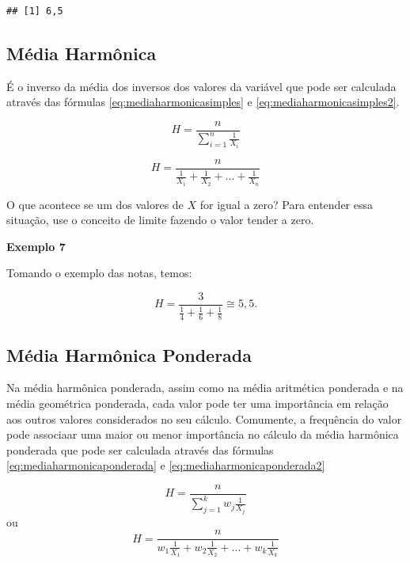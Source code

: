 \documentclass[
]{book}
\begin{document}
\begin{verbatim}
## [1] 6,5
\end{verbatim}

\hypertarget{muxe9dia-harmuxf4nica}{%
\subsection{Média Harmônica}\label{muxe9dia-harmuxf4nica}}

É o inverso da média dos inversos dos valores da variável que pode ser calculada através das fórmulas \eqref{eq:mediaharmonicasimples} e \eqref{eq:mediaharmonicasimples2}.

\begin{equation}
    H = \frac{n}{\sum_{i=1}^{n}\frac{1}{X_i}}
    \label{eq:mediaharmonicasimples}
\end{equation}

\begin{equation}
    H = \frac{n}{\frac{1}{X_1} + \frac{1}{X_2} + \ldots + \frac{1}{X_n}}
    \label{eq:mediaharmonicasimples2}
\end{equation}

O que acontece se um dos valores de \(X\) for igual a zero? Para entender essa situação, use o conceito de limite fazendo o valor tender a zero.

\textbf{Exemplo 7}

Tomando o exemplo das notas, temos:

\begin{equation*}
    H = \frac{3}{\frac{1}{4} + \frac{1}{6} + \frac{1}{8}}\cong 5,5.
\end{equation*}

\hypertarget{muxe9dia-harmuxf4nica-ponderada}{%
\subsection{Média Harmônica Ponderada}\label{muxe9dia-harmuxf4nica-ponderada}}

Na média harmônica ponderada, assim como na média aritmética ponderada e na média geométrica ponderada, cada valor pode ter uma importância em relação aos outros valores considerados no seu cálculo. Comumente, a frequência do valor pode associaar uma maior ou menor importância no cálculo da média harmônica ponderada que pode ser calculada através das fórmulas \eqref{eq:mediaharmonicaponderada} e \eqref{eq:mediaharmonicaponderada2}

\begin{equation}
    H = \frac{n}{\sum_{j=1}^{k}w_{j}\frac{1}{X_j}}
    \label{eq:mediaharmonicaponderada}
\end{equation}
ou
\begin{equation}
    H = \frac{n}{w_1\frac{1}{X_1} + w_2\frac{1}{X_2} + \ldots + w_k \frac{1}{X_k}}
    \label{eq:mediaharmonicaponderada2}
\end{equation}
\end{document}
